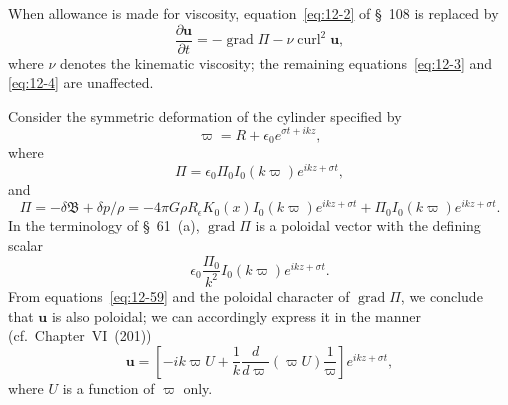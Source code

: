 When allowance is made for viscosity, equation~\eqref{eq:12-2} of \S~108 is replaced by
\begin{equation}
\label{eq:12-59}
\frac{\partial \mathbf{u}}{\partial t} = -\operatorname{grad} \Pi - \nu \operatorname{curl}^2 \mathbf{u},
\end{equation}
where $\nu$ denotes the kinematic viscosity; the remaining equations~\eqref{eq:12-3} and \eqref{eq:12-4} are unaffected.

Consider the symmetric deformation of the cylinder specified by
\begin{equation}
\label{eq:12-60}
\varpi = R + \epsilon_0 e^{\sigma t + ikz},
\end{equation}
where
\begin{equation}
\label{eq:12-61}
\Pi = \epsilon_0 \Pi_0 I_0(k\varpi) e^{i kz + \sigma t},
\end{equation}
and
\begin{equation}
\label{eq:12-62}
\Pi = -\delta\mathfrak{B} + \delta p / \rho = -4\pi G\rho R_\epsilon K_0(x) I_0(k\varpi) e^{ikz+\sigma t} + \Pi_0 I_0(k\varpi) e^{ikz+\sigma t}.
\end{equation}
In the terminology of \S~61~(a), $\operatorname{grad}\Pi$ is a poloidal vector with the defining scalar
\begin{equation}
\label{eq:12-63}
\epsilon_0 \frac{\Pi_0}{k^2} I_0(k\varpi) e^{ikz+\sigma t}.
\end{equation}
From equations~\eqref{eq:12-59} and the poloidal character of $\operatorname{grad}\Pi$, we conclude that $\mathbf{u}$ is also poloidal; we can accordingly express it in the manner (cf.\ Chapter~VI~(201))
\begin{equation}
\label{eq:12-64}
\mathbf{u} = \left[-ik\varpi U + \frac{1}{k} \frac{d}{d\varpi}(\varpi U)\frac{1}{\varpi}\right] e^{ikz+\sigma t},
\end{equation}
where $U$ is a function of $\varpi$ only.

